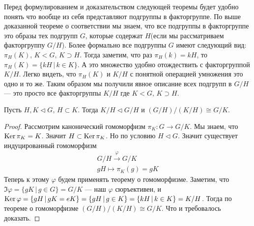\documentclass[../main.tex]{subfiles}
\begin{document}
Перед формулированием и доказательством следующей теоремы будет удобно понять что вообще из себя представляют подгруппы в факторгруппе. По выше доказанной теореме о соответствии мы знаем, что все подгруппы в факторгруппе это образы тех подгрупп $G$, которые содержат $H$(если мы рассматриваем факторгруппу $G/H$). Более формально все подгруппы $G$ имеют следующий вид: $\pi_H(K), \, K < G, \, K \supset H$. Тогда заметим, что раз $\pi_H(k) = kH$, то $\pi_H(K) = \{kH \, | \, k \in K\}$. А это множество удобно отождествить с факторгруппой $K/H$. Легко видеть, что $\pi_H(K)$ и $K/H$ с понятной операцией умножения это одно и то же. Таким образом мы получили явное описание всех подгрупп в $G/H$ --- это просто все факторгруппы $K/H$ где $K < G, \, K \supset H$.

\begin{theorem}
  Пусть $H, K \triangleleft G, \, H \subset K$. Тогда $K/H \triangleleft G/H$ и $(G/H)/(K/H) \cong G/K$.
\end{theorem}
\begin{proof}
  Рассмотрим канонический гомоморфизм $\pi_{K}\colon G \to G/K$. Мы знаем, что $\operatorname{Ker} \pi_{K} = K$. Значит $H \subset \operatorname{Ker} \pi_K$. Но по условию $H \triangleleft G$. Значит существует индуцированный гомоморфизм
  \begin{equation*}
    \begin{gathered}
      G/H \overset{\varphi}{\longrightarrow} G/K \\
      gH \mapsto \pi_K(g) = gK
    \end{gathered}
  \end{equation*}
  Теперь к этому $\varphi$ будем применять теорему о гомоморфизме. Заметим, что $\Im \varphi = \{gK \, | \, g \in G\} = G/K$ --- наш $\varphi$ сюръективен, и $\operatorname{Ker} \varphi = \{gH \, | \, gK = eK\} = \{gH \, | \, g \in K\} = \{kH \, | \, k \in K\} = K / H$. Тогда по теореме о гомоморфизме $(G/H)/(K/H) \cong G/K$. Что и требовалось доказать.
\end{proof}
\end{document}

